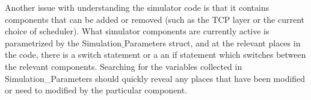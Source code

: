 \documentclass[11pt]{article}%
\begin{document}
Another issue with understanding the simulator code is that it contains components that can be added or removed (such as the TCP layer or the current choice of scheduler).  What simulator components are currently active is parametrized by the Simulation$\_$Parameters struct, and at the relevant places in the code, there is a switch statement or a an if statement which switches between the relevant components.  Searching for the variables collected in Simulation\_Parameters should quickly reveal any places that have been modified or need to modified by the particular component.
\end{document}
